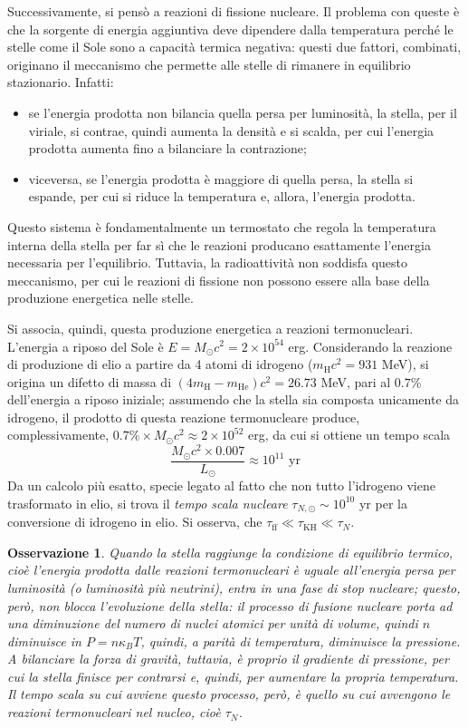 \documentclass[11pt, a4paper]{scrartcl}
\theoremstyle{style}
\newtheorem{osservazione}{Osservazione}[section]
\theoremstyle{style1}
\numberwithin{equation}{subsection}
\begin{document}
Successivamente, si pens\`o a reazioni di fissione nucleare. Il problema con queste \`e che la sorgente di energia aggiuntiva deve dipendere dalla temperatura perch\'e le stelle come il Sole sono a capacit\`a termica negativa: questi due fattori, combinati, originano il meccanismo che permette alle stelle di rimanere in equilibrio stazionario.
Infatti:
\begin{itemize}
	\item se l'energia prodotta non bilancia quella persa per luminosit\`a, la stella, per il viriale, si contrae, quindi aumenta la densit\`a e si scalda, per cui l'energia prodotta aumenta fino a bilanciare la contrazione;
	\item viceversa, se l'energia prodotta \`e maggiore di quella persa, la stella si espande, per cui si riduce la temperatura e, allora, l'energia prodotta.
\end{itemize}
Questo sistema \`e fondamentalmente un termostato che regola la temperatura interna della stella per far s\`i che le reazioni producano esattamente l'energia necessaria per l'equilibrio.
Tuttavia, la radioattivit\`a non soddisfa questo meccanismo, per cui le reazioni di fissione non possono essere alla base della produzione energetica nelle stelle.

Si associa, quindi, questa produzione energetica a reazioni termonucleari. 
L'energia a riposo del Sole \`e $E = M_{\odot} c^2 = 2\times 10^{54}$ erg. 
Considerando la reazione di produzione di elio a partire da 4 atomi di idrogeno ($m_\text{H} c^2 = 931$ MeV), si origina un difetto di massa di $(4m_\text{H} - m_{\text{He}}) c^2 = 26.73 $ MeV, pari al $0.7\%$ dell'energia a riposo iniziale; assumendo che la stella sia composta unicamente da idrogeno, il prodotto di questa reazione termonucleare produce, complessivamente, $0.7\% \times  M_{\odot} c^2\approx 2\times  10^{52}$ erg, da cui si ottiene un tempo scala
\[
\frac{M_\odot c^2 \times 0.007}{L_\odot } \approx 10^{11} \text{ yr}
\] 
Da un calcolo pi\`u esatto, specie legato al fatto che non tutto l'idrogeno viene trasformato in elio, si trova il \textit{tempo scala nucleare} $\tau _{N,\odot } \sim 10^{10}$ yr per la conversione di idrogeno in elio.
Si osserva, che $\tau _\text{ff} \ll \tau _\text{KH} \ll \tau _N$.
\begin{osservazione}
Quando la stella raggiunge la condizione di equilibrio termico, cio\`e l'energia prodotta dalle reazioni termonucleari \`e uguale all'energia persa per luminosit\`a (o luminosit\`a pi\`u neutrini), entra in una fase di \textit{stop nucleare}; questo, per\`o, non blocca l'evoluzione della stella: il processo di fusione nucleare porta ad una diminuzione del numero di nuclei atomici per unit\`a di volume, quindi $n$ diminuisce in $P = n \kappa _B T$, quindi, a parit\`a di temperatura, diminuisce la pressione.
A bilanciare la forza di gravit\`a, tuttavia, \`e proprio il gradiente di pressione, per cui la stella finisce per contrarsi e, quindi, per aumentare la propria temperatura.
Il tempo scala su cui avviene questo processo, per\`o, \`e quello su cui avvengono le reazioni termonucleari nel nucleo, cio\`e $\tau_N$.
\end{osservazione}
\end{document}
